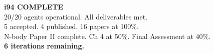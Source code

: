 \documentclass[11pt,a4paper]{article}
\begin{document}
\begin{tcolorbox}[colback=green!5!white, colframe=dfdgreen]
\begin{center}
\Large\textbf{i94 COMPLETE}\\[6pt]
\normalsize 20/20 agents operational. All deliverables met.\\
5 accepted. 4 published. 16 papers at 100\%.\\
N-body Paper II complete. Ch 4 at 50\%. Final Assessment at 40\%.\\
\textbf{6 iterations remaining.}
\end{center}
\end{tcolorbox}
\end{document}
